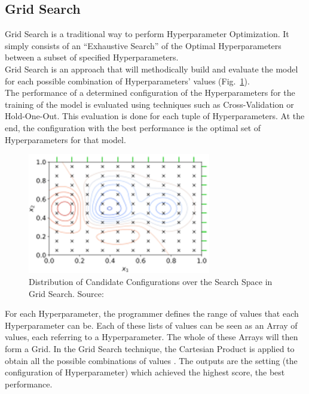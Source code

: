 \subsection{Grid Search}

Grid Search is a traditional way to perform Hyperparameter Optimization. It simply consists of an “Exhaustive Search” of the Optimal Hyperparameters between a subset of specified Hyperparameters.
\\[0.3cm]Grid Search is an approach that will methodically build and evaluate the model for each possible combination of Hyperparameters' values (Fig.~\ref{fig:figure-2.2.2}).
\\[0.3cm]The performance of a determined configuration of the Hyperparameters for the training of the model is evaluated using techniques such as Cross-Validation or Hold-One-Out.
This evaluation is done for each tuple of Hyperparameters. At the end, the configuration with the best performance is the optimal set of Hyperparameters for that model.
\begin{figure}[t]
	\centering
	\includegraphics[width=8cm]{figures/figure-2.2.2.png}
	\caption[Candidates Distribution in Grid Search]{Distribution of Candidate Configurations over the Search Space in Grid Search. Source:~\cite{Tesi-1.1}}
	\label{fig:figure-2.2.2}
\end{figure}

For each Hyperparameter, the programmer defines the range of values that each Hyperparameter can be. Each of these lists of values can be seen as an Array of values, each referring to a Hyperparameter.
The whole of these Arrays will then form a Grid. In the Grid Search technique, the Cartesian Product is applied to obtain all the possible combinations of values \cite{Tesi-1.2}.
The outputs are the setting (the configuration of Hyperparameter) which achieved the highest score, the best performance.


